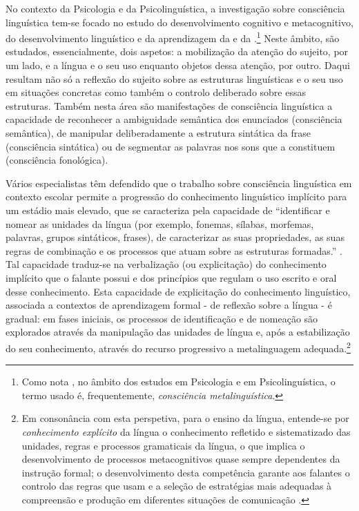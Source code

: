 \documentclass[output=paper]{LSP/langsci}
\begin{document}
No contexto da Psicologia e da Psicolinguística, a investigação sobre consciência linguística tem-se focado no estudo do desenvolvimento cognitivo e metacognitivo, do desenvolvimento linguístico e da aprendizagem da  e da .\footnote{Como nota \citet{castelo2012}, no âmbito dos estudos em Psicologia e em Psicolinguística, o termo usado é, frequentemente, \textit{consciência metalinguística}.} Neste âmbito, são estudados, essencialmente, dois aspetos: a mobilização da atenção do sujeito, por um lado, e a língua e o seu uso enquanto objetos dessa atenção, por outro. Daqui resultam não só a reflexão do sujeito sobre as estruturas linguísticas e o seu uso em situações concretas como também o controlo deliberado sobre essas estruturas. Também nesta área são manifestações de consciência linguística  a capacidade de reconhecer a ambiguidade semântica dos enunciados (consciência semântica), de manipular deliberadamente a estrutura sintática da frase (consciência sintática) ou de segmentar as palavras nos sons que a constituem (consciência fonológica).

Vários especialistas têm defendido que o trabalho sobre consciência linguística  em contexto escolar permite a progressão do conhecimento linguístico implícito para um estádio mais elevado, que se caracteriza pela capacidade de “identificar e nomear as unidades da língua (por exemplo, fonemas, sílabas, morfemas, palavras, grupos sintáticos, frases), de caracterizar as suas propriedades, as suas regras de combinação e os processos que atuam sobre as estruturas formadas.” \citep[17]{duarte2008}. Tal capacidade traduz-se na verbalização (ou explicitação) do conhecimento implícito que o falante possui e dos princípios que regulam o uso escrito e oral desse conhecimento. Esta capacidade de explicitação do conhecimento linguístico, associada a contextos de aprendizagem formal - de reflexão sobre a língua - é gradual: em fases iniciais, os processos de identificação e de nomeação são explorados através da manipulação das unidades de língua e, após a estabilização do seu conhecimento, através do recurso progressivo a metalinguagem adequada.\footnote{Em consonância com esta perspetiva, para o ensino da língua, entende-se por \textit{conhecimento explícito} da língua o conhecimento refletido e sistematizado das unidades, regras e processos gramaticais da língua, o que implica o desenvolvimento de processos metacognitivos quase sempre dependentes da instrução formal; o desenvolvimento desta competência garante aos falantes o controlo das regras que usam e a seleção de estratégias mais adequadas à compreensão e produção em diferentes situações de comunicação \citep{simsim_etal1997}.}  
\end{document}
